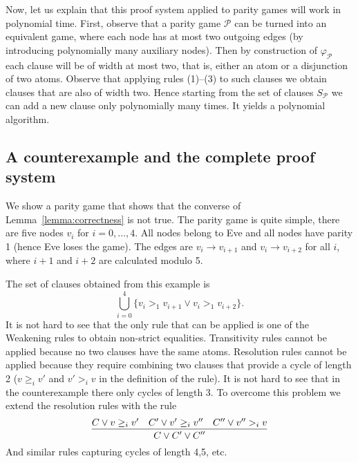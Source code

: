 \documentclass[a4paper,10pt]{article}
\begin{document}
Now, let us explain that this proof system applied to parity games will work in polynomial time. First, observe that a parity game $\mathcal{P}$ can be turned into an equivalent game, where each node has at most two outgoing edges (by introducing polynomially many auxiliary nodes). Then by construction of $\varphi_{\mathcal{P}}$ each clause will be of width at most two, that is, either an atom or a disjunction of two atoms. Observe that applying rules (1)--(3) to such clauses we obtain clauses that are also of width two. Hence starting from the set of clauses $S_{\mathcal{P}}$ we can add a new clause only polynomially many times. It yields a polynomial algorithm.

\subsection{A counterexample and the complete proof system}

We show a parity game that shows that the converse of Lemma~\ref{lemma:correctness} is not true. The parity game is quite simple, there are five nodes $v_i$ for $i = 0,\ldots,4$. All nodes belong to Eve and all nodes have parity 1 (hence Eve loses the game). The edges are $v_i \to v_{i+1}$ and $v_i \to v_{i + 2}$ for all $i$, where $i+1$ and $i+2$ are calculated modulo 5.

\begin{center}
\end{center}

The set of clauses obtained from this example is
$$
\bigcup_{i=0}^{4} \{v_i >_1 v_{i+1} \vee v_i >_1 v_{i+2}\}.
$$
It is not hard to see that the only rule that can be applied is one of the Weakening rules to obtain non-strict equalities. Transitivity rules cannot be applied because no two clauses have the same atoms. Resolution rules cannot be applied because they require combining two clauses that provide a cycle of length 2 ($v \ge_i v'$ and $v' >_i v$ in the definition of the rule). It is not hard to see that in the counterexample there only cycles of length 3. To overcome this problem we extend the resolution rules with the rule
$$
\infer{C \vee C' \vee C''}{
    C \vee v \ge_i v' & C' \vee v' \ge_i v'' & C'' \vee v'' >_i v
}
$$
And similar rules capturing cycles of length 4,5, etc.
\end{document}

